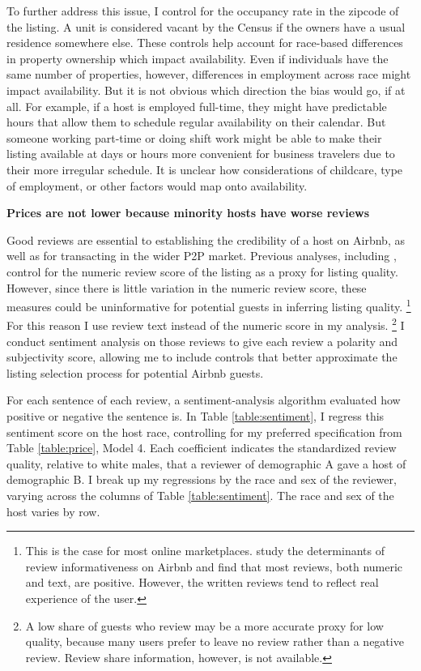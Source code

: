 To further address this issue, I control for the occupancy rate in the zipcode of the listing. A unit is considered vacant by the Census if the owners have a usual residence somewhere else. These controls help account for race-based differences in property ownership which impact availability. Even if individuals have the same number of properties, however, differences in employment across race might impact availability. But it is not obvious which direction the bias would go, if at all. For example, if a host is employed full-time, they might have predictable hours that allow them to schedule regular availability on their calendar. But someone working part-time or doing shift work might be able to make their listing available at days or hours more convenient for business travelers due to their more irregular schedule. It is unclear how considerations of childcare, type of employment, or other factors would map onto availability. 





\textbf{Prices are not lower because minority hosts have worse reviews} 

Good reviews are essential to establishing the credibility of a host on Airbnb, as well as for transacting in the wider P2P market. Previous analyses, including \cite{edelman}, control for the numeric review score of the listing as a proxy for listing quality. However, since there is little variation in the numeric review score, these measures could be uninformative for potential guests in inferring listing quality.%
	\footnote{This is the case for most online marketplaces. \cite{fradkin} study the determinants of review informativeness on Airbnb and find that most reviews, both numeric and text, are positive. However, the written reviews tend to reflect real experience of the user.} 
For this reason I use review text instead of the numeric score in my analysis.%
	\footnote{A low share of guests who review may be a more accurate proxy for low quality, because many users prefer to leave no review rather than a negative review. Review share information, however, is not available.} 
I conduct sentiment analysis on those reviews to give each review a polarity and subjectivity score, allowing me to include controls that better approximate the listing selection process for potential Airbnb guests.

For each sentence of each review, a sentiment-analysis algorithm evaluated how positive or negative the sentence is. In Table \ref{table:sentiment}, I regress this sentiment score on the host race, controlling for my preferred specification from Table \ref{table:price}, Model 4. Each coefficient indicates the standardized review quality, relative to white males, that a reviewer of demographic A gave a host of demographic B. I break up my regressions by the race and sex of the reviewer, varying across the columns of Table \ref{table:sentiment}. The race and sex of the host varies by row. 

